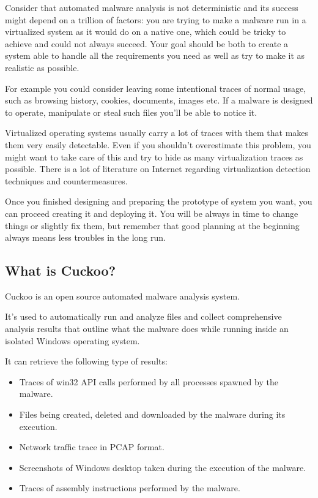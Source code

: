 \documentclass[letterpaper,10pt,english]{sphinxmanual}
\begin{document}
Consider that automated malware analysis is not deterministic and its success
might depend on a trillion of factors: you are trying to make a malware run
in a virtualized system as it would do on a native one, which could be tricky to
achieve and could not always succeed.
Your goal should be both to create a system able to handle all the requirements
you need as well as try to make it as realistic as possible.

For example you could consider leaving some intentional traces of normal usage,
such as browsing history, cookies, documents, images etc. If a malware is
designed to operate, manipulate or steal such files you'll be able to notice it.

Virtualized operating systems usually carry a lot of traces with them that makes
them very easily detectable. Even if you shouldn't overestimate this problem,
you might want to take care of this and try to hide as many virtualization
traces as possible.
There is a lot of literature on Internet regarding virtualization detection
techniques and countermeasures.

Once you finished designing and preparing the prototype of system you want, you
can proceed creating it and deploying it. You will be always in time to
change things or slightly fix them, but remember that good planning at the
beginning always means less troubles in the long run.


\subsection{What is Cuckoo?}
\label{introduction/what::doc}\label{introduction/what:what-is-cuckoo}
Cuckoo is an open source automated malware analysis system.

It's used to automatically run and analyze files and collect comprehensive
analysis results that outline what the malware does while running inside an
isolated Windows operating system.

It can retrieve the following type of results:
\begin{itemize}
\item {} 
Traces of win32 API calls performed by all processes spawned by the malware.

\item {} 
Files being created, deleted and downloaded by the malware during its execution.

\item {} 
Network traffic trace in PCAP format.

\item {} 
Screenshots of Windows desktop taken during the execution of the malware.

\item {} 
Traces of assembly instructions performed by the malware.

\end{itemize}
\end{document}
